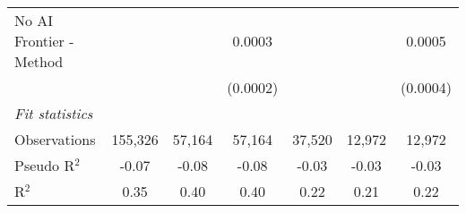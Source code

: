 \begin{tabular}{lcccccc}
   No AI Frontier - Method &                &               & 0.0003         &               &          & 0.0005\\   
                           &                &               & (0.0002)       &               &          & (0.0004)\\   
   \midrule
   \emph{Fit statistics}\\
   Observations            & 155,326        & 57,164        & 57,164         & 37,520        & 12,972   & 12,972\\  
   Pseudo R$^2$            & -0.07          & -0.08         & -0.08          & -0.03         & -0.03    & -0.03\\  
   R$^2$                   & 0.35           & 0.40          & 0.40           & 0.22          & 0.21     & 0.22\\  
   

\end{tabular}
